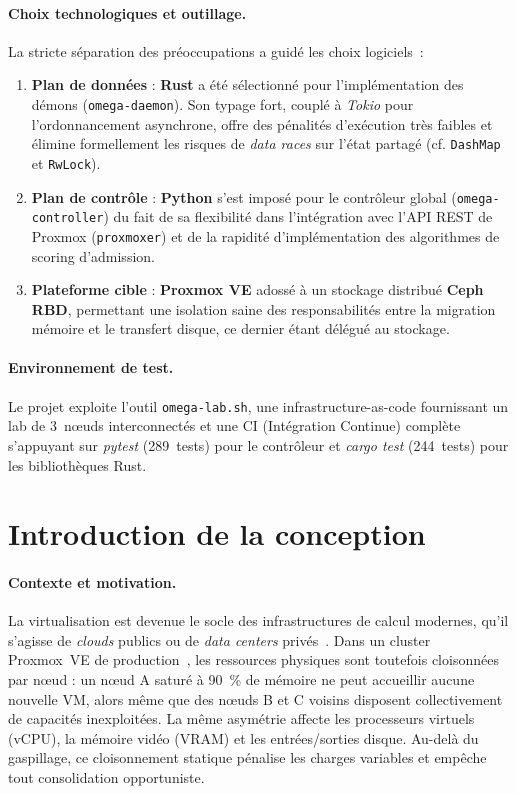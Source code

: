 \paragraph{Choix technologiques et outillage.}
La stricte séparation des préoccupations a guidé les choix logiciels~:
\begin{enumerate}
    \item \textbf{Plan de données} : \textbf{Rust} a été sélectionné pour l'implémentation des démons (\texttt{omega-daemon}). Son typage fort, couplé à \textit{Tokio} pour l'ordonnancement asynchrone, offre des pénalités d'exécution très faibles et élimine formellement les risques de \textit{data races} sur l'état partagé (cf. \texttt{DashMap} et \texttt{RwLock}).
    \item \textbf{Plan de contrôle} : \textbf{Python} s'est imposé pour le contrôleur global (\texttt{omega-controller}) du fait de sa flexibilité dans l'intégration avec l'API REST de Proxmox (\texttt{proxmoxer}) et de la rapidité d'implémentation des algorithmes de scoring d'admission.
    \item \textbf{Plateforme cible} : \textbf{Proxmox VE} adossé à un stockage distribué \textbf{Ceph RBD}, permettant une isolation saine des responsabilités entre la migration mémoire et le transfert disque, ce dernier étant délégué au stockage.
\end{enumerate}

\paragraph{Environnement de test.}
Le projet exploite l'outil \texttt{omega-lab.sh}, une infrastructure-as-code fournissant un lab de 3~nœuds interconnectés et une CI (Intégration Continue) complète s'appuyant sur \textit{pytest} (289~tests) pour le contrôleur et \textit{cargo test} (244~tests) pour les bibliothèques Rust.

\section*{Introduction de la conception}

\paragraph{Contexte et motivation.}
La virtualisation est devenue le socle des infrastructures de calcul modernes, qu'il s'agisse de \textit{clouds} publics ou de \textit{data centers} privés~\cite{verma_2015_borg}. Dans un cluster Proxmox~VE de production~\cite{proxmox_doc}, les ressources physiques sont toutefois cloisonnées par nœud : un nœud A saturé à 90~\% de mémoire ne peut accueillir aucune nouvelle VM, alors même que des nœuds B et C voisins disposent collectivement de capacités inexploitées. La même asymétrie affecte les processeurs virtuels (vCPU), la mémoire vidéo (VRAM) et les entrées/sorties disque. Au-delà du gaspillage, ce cloisonnement statique pénalise les charges variables et empêche tout consolidation opportuniste.

